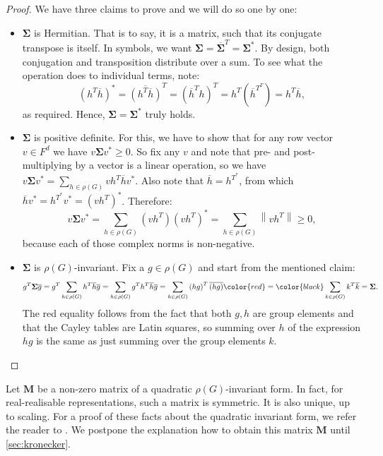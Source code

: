 \documentclass[11pt]{article}
\begin{document}
\begin{proof}
  We have three claims to prove and we will do so one by one:
  \begin{itemize}
    \item $\mathbf{\Sigma}$ is Hermitian. That is to say, it is a matrix, such that its conjugate
    transpose is itself. In symbols, we want $\mathbf{\Sigma} = \overline{\mathbf{\Sigma}}^T = \mathbf{\Sigma}^*$.
    By design, both conjugation and transposition distribute over a sum. To see what the operation
    does to individual terms, note:
    \[\left(h^T\overline{h}\right)^* = \overline{\left(h^T\overline{h}\right)}^T =
    \left(\overline{h}^Th\right)^T = h^T\left(\overline{h}^{T^T}\right) = h^T\overline{h},\]
    as required. Hence, $\mathbf{\Sigma} = \mathbf{\Sigma}^*$ truly holds.
    \item $\mathbf{\Sigma}$ is positive definite. For this, we have to show that for any row vector $v \in F^d$
    we have $v\mathbf{\Sigma}v^* \geq 0$. So fix any $v$ and note that pre- and post-multiplying by
    a vector is a linear operation, so we have $v\mathbf{\Sigma}v^* = \sum_{h \in \rho(G)} vh^T\overline{h}v^*$.
    Also note that $\overline{h} = h^{T^*}$, from which $\overline{h}v^* = h^{T^*}v^* = \left(vh^T\right)^*$. Therefore:
    \[v\mathbf{\Sigma}v^* = \sum_{h \in \rho(G)} \left(vh^T\right)\left(vh^T\right)^* = \sum_{h \in \rho(G)} \left\lVert vh^T\right\rVert \geq 0,\]
    because each of those complex norms is non-negative.
    \item $\mathbf{\Sigma}$ is $\rho(G)$-invariant. Fix a $g \in \rho(G)$ and start from the mentioned claim:
    \[g^T\mathbf{\Sigma}\overline{g} = g^T\sum_{h \in \rho(G)}h^T\overline{h} \overline{g} = \sum_{h \in \rho(G)}g^Th^T\overline{h} \overline{g}=
    \sum_{h \in \rho(G)} \left(hg\right)^T \overline{(hg)} \color{red}=\color{black} \sum_{k \in \rho(G)} k^T \overline{k} = \mathbf{\Sigma}.\]
    The red equality follows from the fact that both $g,h$ are group elements and that the Cayley tables are Latin squares, so
    summing over $h$ of the expression $hg$ is the same as just summing over the group elements $k$.
  \end{itemize}
\end{proof}

Let $\mathbf{M}$ be a non-zero matrix of a quadratic $\rho(G)$-invariant form.
In fact, for real-realisable representations, such a matrix is symmetric. It is
also unique, up to scaling. For a proof of these facts about the quadratic
invariant form, we refer the reader to \cite[(4.14)]{ISAACS}. We postpone the
explanation how to obtain this matrix $\mathbf{M}$ until \cref{sec:kronecker}.
\end{document}
